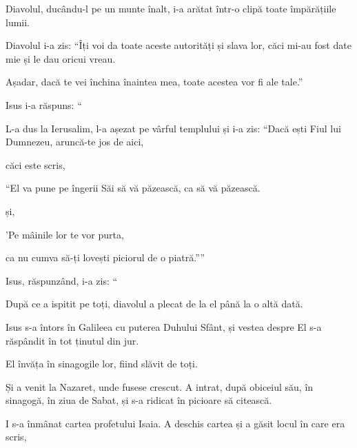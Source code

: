 {\par }{\PP {}Diavolul, ducându-l pe un munte înalt, i-a arătat într-o clipă toate împărățiile lumii.

Diavolul i-a zis: “Îți voi da toate aceste autorități și slava lor, căci mi-au fost date mie și le dau oricui vreau.

Așadar, dacă te vei închina înaintea mea, toate acestea vor fi ale tale.”


\par }{\PP {}Isus i-a răspuns: “{}


\par }{\PP {}L-a dus la Ierusalim, l-a așezat pe vârful templului și i-a zis: “Dacă ești Fiul lui Dumnezeu, aruncă-te jos de aici,

căci este scris,

\par }{\Q “El va pune pe îngerii Săi să vă păzească, ca să vă păzească.


\par }{\PP {}și,

\par }{\Q 'Pe mâinile lor te vor purta,

\par }{\QB ca nu cumva să-ți lovești piciorul de o piatră.””


\par }{\PP {}Isus, răspunzând, i-a zis: “{}


\par }{\PP {}După ce a ispitit pe toți, diavolul a plecat de la el până la o altă dată.


\par }{\PP {}Isus s-a întors în Galileea cu puterea Duhului Sfânt, și vestea despre El s-a răspândit în tot ținutul din jur.

El învăța în sinagogile lor, fiind slăvit de toți.


\par }{\PP {}Și a venit la Nazaret, unde fusese crescut. A intrat, după obiceiul său, în sinagogă, în ziua de Sabat, și s-a ridicat în picioare să citească.

I s-a înmânat cartea profetului Isaia. A deschis cartea și a găsit locul în care era scris,


\par }{\Q {}

}
